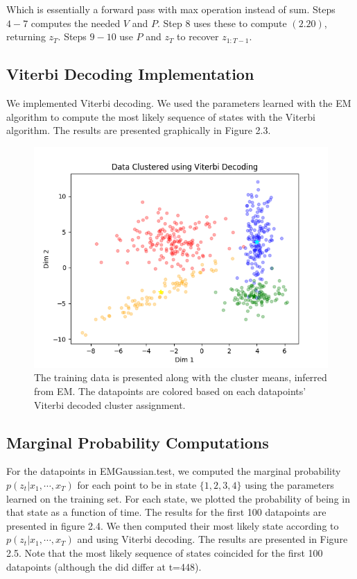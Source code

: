 \documentclass[paper=a4, fontsize=11pt]{scrartcl} %
\numberwithin{equation}{section} %
\numberwithin{figure}{section} %
\numberwithin{table}{section} %
\begin{document}
Which is essentially a forward pass with max operation instead of sum. Steps $4-7$ computes the needed $V$ and $P$. Step $8$ uses these to compute $(2.20)$, returning $z_T$. Steps $9-10$ use $P$ and $z_T$ to recover $z_{1:T-1}$.

\subsection{Viterbi Decoding Implementation}

We implemented Viterbi decoding. We used the parameters learned with the EM algorithm to compute the most likely sequence of states with the Viterbi algorithm. The results are presented graphically in Figure 2.3.

\begin{figure}
	\includegraphics[width=.9\linewidth]{Viterbi_Plot.png}
	\caption{The training data is presented along with the cluster means, inferred from EM. The datapoints are colored based on each datapoints' Viterbi decoded cluster assignment.}
\end{figure}

\subsection{Marginal Probability Computations}

For the datapoints in EMGaussian.test, we computed the marginal probability
\(p(z_t|x_1, \cdots , x_T )\) for each point to be in state \(\{1, 2, 3, 4\}\) using the parameters learned on the training set. For each state, we plotted the probability of being in that state as a function of time. The results for the first 100 datapoints are presented in figure 2.4. We then computed their most likely state according to \(p(z_t|x_1, \cdots , x_T )\) and using Viterbi decoding. The results are presented in Figure 2.5. Note that the most likely sequence of states coincided for the first 100 datapoints (although the did differ at t=448).
\end{document}

